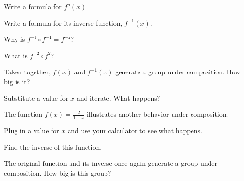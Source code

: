 \documentclass[../key.tex]{subfiles}
\begin{document}
\begin{inner_problem}
\item Write a formula for $f^n(x)$.
\end{inner_problem}

\begin{inner_problem}
\item Write a formula for its inverse function, $f^{-1}(x)$.
\end{inner_problem}

\begin{inner_problem}
\item Why is $f^{-1}\circ f^{-1}=f^{-2}$?
\end{inner_problem}

\begin{inner_problem}
\item What is $f^{-2}\circ f^2$?
\end{inner_problem}

\begin{inner_problem}
\item Taken together, $f(x)$ and $f^{-1}(x)$ generate a group under composition. How big is it?
\end{inner_problem}

\begin{inner_problem}
\item Substitute a value for $x$ and iterate. What happens?
\end{inner_problem}

\begin{outer_problem}
\item The function $f(x)=\frac{2}{1-x}$ illustrates another behavior under composition.
\end{outer_problem}

\begin{inner_problem}[start=1]
\item Plug in a value for $x$ and use your calculator to see what happens.
\end{inner_problem}

\begin{inner_problem}
\item Find the inverse of this function.
\end{inner_problem}

\begin{inner_problem}
\item The original function and its inverse once again generate a group under composition. How big is this group?
\end{inner_problem}
\end{document}
